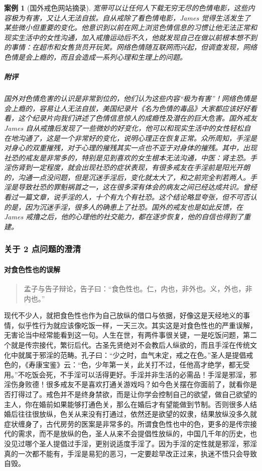 \documentclass{ctexart}
\newtheorem{case}{案例}
\begin{document}
\begin{case}[国外戒色网站摘录]
    宽带可以让任何人下载无穷无尽的色情电影，这些内容极为有害，又让人无法自拔。自从戒除了看色情电影，James 觉得生活发生了某些微小但重要的变化。他意识到以前在网上浏览色情信息的习惯让他无法正常和现实生活中的女性沟通，加入戒撸运动后不久，他就发现自己在做以前根本想不到的事情：在超市和女售货员开玩笑。网络色情随互联网而兴起，但调查发现，网络色情是会上瘾的，而且会造成一系列心理和生理上的问题。
    \subparagraph{附评} 国外对色情危害的认识是非常到位的，他们认为这些内容“极为有害”！网络色情是会上瘾的，容易让人无法自拔，美国纪录片《名为色情的毒品》大家都应该好好看看，这个纪录片向我们讲述了色情信息惊人的成瘾性及潜在的巨大危害。国外戒友 James 自从戒撸后发现了一些微妙的好变化，他可以和现实生活中的女性轻松自在地沟通了，这是一个非常好的变化，说明心理正在恢复正常。众所周知，手淫是对身心的双重摧残，对于心理的摧残其实一点也不亚于对身体的摧残。其中，出现社恐的戒友是非常多的，特别是见到喜欢的女生根本无法沟通，中医：肾主恐。手淫伤肾到一定程度，就会出现社恐的症状表现，有很多戒友在手淫前是阳光开朗的，沟通一点没问题，但是沉迷手淫后，变化就太大了，和之前完全判若两人。手淫是导致社恐的罪魁祸首之一，这在很多深有体会的病友之间已经达成共识。曾经看过一篇文章，说手淫的人，十个有九个有社恐。这个结论略显夸张，但不可否认的是，因为沉迷手淫，很多人的确患上了社恐。国外的戒友也是如此反馈，在 James 戒撸之后，他的心理他的社交能力，都在逐步恢复，他的自信也得到了重建。
\end{case}

\subsubsection{关于 2 点问题的澄清}

\paragraph{对食色性也的误解}

\begin{quote}
    孟子与告子辩论，告子曰：“食色性也。仁，内也，非外也。义，外也，非内也。”
\end{quote}

现代不少人，就把食色性也作为自己放纵的借口与依据，好像这是天经地义的事情，似乎性行为就应该像吃饭一样，一天三次。其实这是对食色性也的严重误解，无害论当中经常能看到这一句。人生在世，有两件事很关键，一是吃饭问题，第二个就是传宗接代，繁衍后代。古圣先贤绝对不会教后人纵欲的，而且手淫在传统文化中就属于邪淫的范畴。孔子曰：“少之时，血气未定，戒之在色。”圣人是提倡戒色的，《寿康宝鉴》云：“色，少年第一关，此关打不过，任他高才绝学，都无受用。”不吃饭会死，不手淫可以活得更好。手淫并非生活的必需品！手淫是邪淫，邪淫伤身败德！很多戒友不是喜欢打通关游戏吗？如今色关摆在你面前了，就看你是否打得过了。戒色并不是终身禁欲，而是让你学会控制自己的欲望，做自己欲望的主人，你在婚前如果能够打通色关，那么在婚后才有望能做到节制。否则很多人结婚后往往很放纵，色关从来没有打通过，依然还是欲望的奴隶，结果放纵没多久就症状缠身了，古代房劳的医案是非常多的。所谓食色性也中的色，更多的是传宗接代的需求，而不是放纵的色，圣人从来不会提倡性放纵的，中国几千年的历史，也没见过哪个圣人提倡过手淫，更别说适度手淫了。因为手淫的定性就是邪淫，邪淫真的一次都不能有，手淫是易犯的恶习，一定要趁早改正过来，执迷不悟只会导致自毁。
\end{document}
